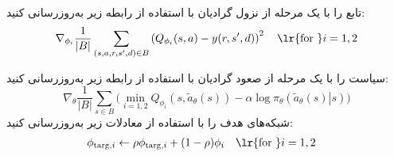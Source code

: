 \begin{algorithm}[H]
\begin{algorithmic}[1]
		\State تابع  را با یک مرحله از نزول گرادیان با استفاده از رابطه زیر به‌روزرسانی کنید:
		\begin{align*} 
			\nabla_{\phi_i} \frac{1}{|B|}\sum_{(s,a,r,s',d) \in B} \left( Q_{\phi_i}(s,a) - y(r,s',d) \right)^2 
			\quad \text{\lr{for }}i=1,2 
		\end{align*}
		
		\State سیاست را با یک مرحله از صعود گرادیان با استفاده از رابطه زیر به‌روزرسانی کنید:
		\begin{equation*}
			\nabla_{\theta} \frac{1}{|B|}\sum_{s \in B} \Big(\min_{i=1,2} Q_{\phi_i}(s, \tilde{a}_{\theta}(s)) - \alpha \log \pi_{\theta} \left(\left. \tilde{a}_{\theta}(s) \right| s\right) \Big)
		\end{equation*}
		\State شبکه‌های هدف را با استفاده از معادلات زیر به‌روزرسانی کنید:
		\begin{align*}
			\phi_{\text{targ},i} &\leftarrow \rho \phi_{\text{targ}, i} + (1-\rho) \phi_i \quad \text{\lr{for }}i=1,2  
		\end{align*}
		\EndFor
		\EndIf
		\EndWhile
	\end{algorithmic}
\end{algorithm}

